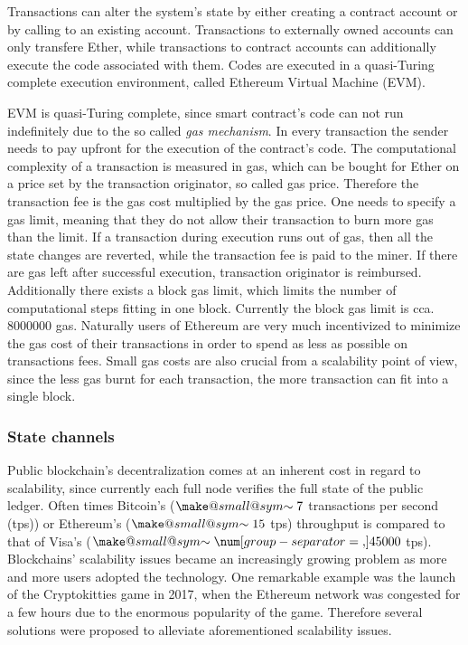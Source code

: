 \documentclass[conference, compsoc]{IEEEtran}
\makeatletter
\theoremstyle{definition}
\newcommand{\smallsim}{\smallsym{\mathrel}{\sim}}
\newcommand{\smallsym}[2]{#1{\mathpalette\make@small@sym{#2}}}
\newcommand{\make@small@sym}[2]{%
	\vcenter{\hbox{$\m@th\downgrade@style#1#2$}}%
}
\newcommand{\downgrade@style}[1]{%
	\ifx#1\displaystyle\scriptstyle\else
	\ifx#1\textstyle\scriptstyle\else
	\scriptscriptstyle
	\fi\fi
}
\makeatother
\begin{document}
Transactions can alter the system's state by either creating a contract account or by calling to an existing account. Transactions to externally owned accounts can only transfere Ether, while transactions to contract accounts can additionally execute the code associated with them. Codes are executed in a quasi-Turing complete execution environment, called Ethereum Virtual Machine (EVM).

EVM is quasi-Turing complete, since smart contract's code can not run indefinitely due to the so called \textit{gas mechanism}. In every transaction the sender needs to pay upfront for the execution of the contract's code. The computational complexity of a transaction is measured in gas, which can be bought for Ether on a price set by the transaction originator, so called gas price. Therefore the transaction fee is the gas cost multiplied by the gas price. One needs to specify a gas limit, meaning that they do not allow their transaction to burn more gas than the limit. If a transaction during execution runs out of gas, then all the state changes are reverted, while the transaction fee is paid to the miner. If there are gas left after successful execution, transaction originator is reimbursed. Additionally there exists a block gas limit, which limits the number of computational steps fitting in one block. Currently the block gas limit is cca. $\num[group-separator={,}]{8000000}$ gas. Naturally users of Ethereum are very much incentivized to minimize the gas cost of their transactions in order to spend as less as possible on transactions fees. Small gas costs are also crucial from a scalability point of view, since the less gas burnt for each transaction, the more transaction can fit into a single block.   

\subsubsection{State channels} 
Public blockchain's decentralization comes at an inherent cost in regard to scalability, since currently each full node verifies the full state of the public ledger. Often times Bitcoin's ($\smallsim7$ transactions per second (tps)) or Ethereum's ($\smallsim15$ tps) throughput is compared to that of Visa's ($\smallsim\num[group-separator={,}]{45000}$ tps). Blockchains' scalability issues became an increasingly growing problem as more and more users adopted the technology. One remarkable example was the launch of the Cryptokitties game in 2017, when the Ethereum network was congested for a few hours due to the enormous popularity of the game. Therefore several solutions were proposed to alleviate aforementioned scalability issues.
\end{document}
